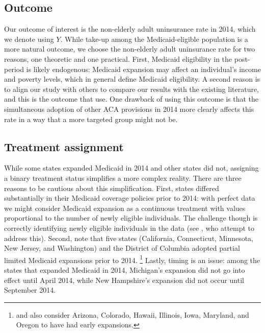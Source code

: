\documentclass[aoas]{imsart}
\theoremstyle{plain}
\theoremstyle{remark}
\begin{document}
\subsection{Outcome}

Our outcome of interest is the non-elderly adult uninsurance rate in 2014, which we denote using $Y$. While take-up among the Medicaid-eligible population is a more natural outcome, we choose the non-elderly adult uninsurance rate for two reasons, one theoretic and one practical. First, Medicaid eligibility in the post-period is likely endogenous: Medicaid expansion may affect an individual's income and poverty levels, which in general define Medicaid eligibility. A second reason is to align our study with others to compare our results with the existing literature, and this is the outcome that \cite{courtemanche2017early} use. One drawback of using this outcome is that the simultaneous adoption of other ACA provisions in 2014 more clearly affects this rate in a way that a more targeted group might not be.

\subsection{Treatment assignment} \label{sssec:txassign}

While some states expanded Medicaid in 2014 and other states did not, assigning a binary treatment status simplifies a more complex reality. There are three reasons to be cautious about this simplification. First, states differed substantially in their Medicaid coverage policies prior to 2014: with perfect data we might consider Medicaid expansion as a continuous treatment with values proportional to the number of newly eligible individuals. The challenge though is correctly identifying newly eligible individuals in the data (see \cite{frean2017premium}, who attempt to address this). Second, \cite{frean2017premium} note that five states (California, Connecticut, Minnesota, New Jersey, and Washington) and the District of Columbia adopted partial limited Medicaid expansions prior to 2014. \footnote{\cite{kaestner2017effects} and \cite{courtemanche2017early} also consider Arizona, Colorado, Hawaii, Illinois, Iowa, Maryland, and Oregon to have had early expansions.} Lastly, timing is an issue: among the states that expanded Medicaid in 2014, Michigan's expansion did not go into effect until April 2014, while New Hampshire's expansion did not occur until September 2014.
\end{document}
